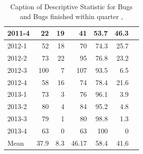 \documentclass[UKenglish]{ifimaster}  %
\begin{document}
\begin{appendices}
\begin{table}[!htbp]
\begin{adjustwidth}{-2.5cm}{}
{{\begin{tabular}{ | l | r | r | r | r | r | r | }
2011-4 & 22 & 19 & 41 & 53.7 & 46.3 \\ \hline
2012-1 & 52 & 18 & 70 & 74.3 & 25.7 \\ \hline
2012-2 & 73 & 22 & 95 & 76.8 & 23.2 \\ \hline
2012-3 & 100 & 7 & 107 & 93.5 & 6.5 \\ \hline
2012-4 & 58 & 16 & 74 & 78.4 & 21.6 \\ \hline
2013-1 & 73 & 3 & 76 & 96.1 & 3.9 \\ \hline
2013-2 & 80 & 4 & 84 & 95.2 & 4.8 \\ \hline
2013-3 & 79 & 1 & 80 & 98.8 & 1.3 \\ \hline
2013-4 & 63 & 0 & 63 & 100 & 0 \\ \hline
Mean & 37.9 & 8.3 & 46.17 & 58.4& 41.6 \\ \hline
\end{tabular}
}
}
\end{adjustwidth}
\caption[Optional caption for list of figures]{Caption of Descriptive Statistic for Bugs and Bugs finished within quarter  , }
\label{DS:2:5} %
\end{table}


\end{appendices}
\end{document}
